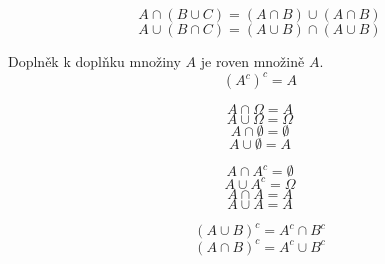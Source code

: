 \begin{theorem}
\begin{equation*}
A \cap (B \cup C) = (A \cap B) \cup (A \cap B)
\end{equation*}
\begin{equation*}
A \cup (B \cap C) = (A \cup B) \cap (A \cup B)
\end{equation*}
\end{theorem}

\begin{theorem}
Doplněk k doplňku množiny $A$ je roven množině $A$.
\begin{equation*}
(A^c)^c = A
\end{equation*}
\end{theorem}

\begin{theorem}
\begin{equation*}
A \cap \Omega = A
\end{equation*}
\begin{equation*}
A \cup \Omega = \Omega
\end{equation*}
\begin{equation*}
A \cap \emptyset = \emptyset
\end{equation*}
\begin{equation*}
A \cup \emptyset = A
\end{equation*}
\end{theorem}

\begin{theorem}
\begin{equation*}
A \cap  A^c = \emptyset 
\end{equation*}
\begin{equation*}
A \cup A^c = \Omega
\end{equation*}
\begin{equation*}
A \cap A = A
\end{equation*}
\begin{equation*}
A \cup A = A
\end{equation*}
\end{theorem}

\begin{theorem}
\begin{equation*}
(A \cup B)^c = A^c \cap B^c
\end{equation*}
\begin{equation*}
(A \cap B)^c = A^c \cup B^c
\end{equation*}
\end{theorem}

